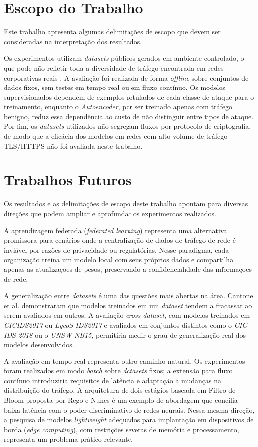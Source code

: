 \section{Escopo do Trabalho}

Este trabalho apresenta algumas delimitações de escopo que devem ser consideradas na interpretação dos resultados.

Os experimentos utilizam \textit{datasets} públicos gerados em ambiente controlado, o que pode não refletir toda a diversidade de tráfego encontrada em redes corporativas reais \cite{cantone2024}. A avaliação foi realizada de forma \textit{offline} sobre conjuntos de dados fixos, sem testes em tempo real ou em fluxo contínuo. Os modelos supervisionados dependem de exemplos rotulados de cada classe de ataque para o treinamento, enquanto o \textit{Autoencoder}, por ser treinado apenas com tráfego benigno, reduz essa dependência ao custo de não distinguir entre tipos de ataque. Por fim, os \textit{datasets} utilizados não segregam fluxos por protocolo de criptografia, de modo que a eficácia dos modelos em redes com alto volume de tráfego TLS/HTTPS não foi avaliada neste trabalho.

\section{Trabalhos Futuros}

Os resultados e as delimitações de escopo deste trabalho apontam para diversas direções que podem ampliar e aprofundar os experimentos realizados.

A aprendizagem federada (\textit{federated learning}) representa uma alternativa promissora para cenários onde a centralização de dados de tráfego de rede é inviável por razões de privacidade ou regulatórias. Nesse paradigma, cada organização treina um modelo local com seus próprios dados e compartilha apenas as atualizações de pesos, preservando a confidencialidade das informações de rede.

A generalização entre \textit{datasets} é uma das questões mais abertas na área. Cantone et al. \cite{cantone2024} demonstraram que modelos treinados em um \textit{dataset} tendem a fracassar ao serem avaliados em outros. A avaliação \textit{cross-dataset}, com modelos treinados em \textit{CICIDS2017} ou \textit{LycoS-IDS2017} e avaliados em conjuntos distintos como o \textit{CIC-IDS-2018} ou o \textit{UNSW-NB15}, permitiria medir o grau de generalização real dos modelos desenvolvidos.

A avaliação em tempo real representa outro caminho natural. Os experimentos foram realizados em modo \textit{batch} sobre \textit{datasets} fixos; a extensão para fluxo contínuo introduziria requisitos de latência e adaptação a mudanças na distribuição do tráfego. A arquitetura de dois estágios baseada em Filtro de Bloom proposta por Rego e Nunes \cite{rego_nunes} é um exemplo de abordagem que concilia baixa latência com o poder discriminativo de redes neurais. Nessa mesma direção, a pesquisa de modelos \textit{lightweight} adequados para implantação em dispositivos de borda (\textit{edge computing}), com restrições severas de memória e processamento, representa um problema prático relevante.


